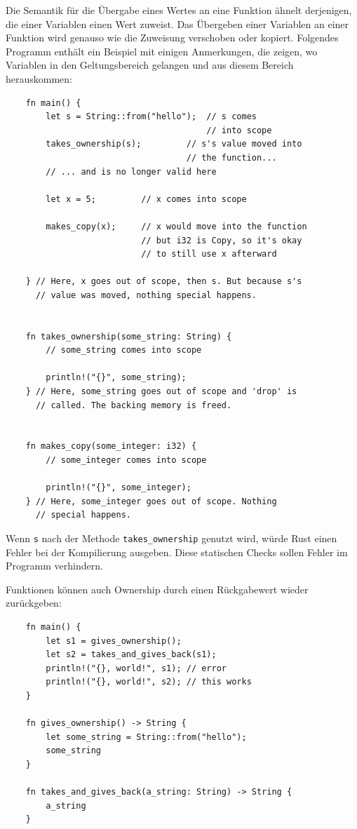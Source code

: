 Die Semantik für die Übergabe eines Wertes an eine Funktion ähnelt derjenigen, die einer Variablen einen Wert zuweist. Das Übergeben einer Variablen an einer Funktion wird genauso wie die Zuweisung verschoben oder kopiert. Folgendes Programm enthält ein Beispiel mit einigen Anmerkungen, die zeigen, wo Variablen in den Geltungsbereich gelangen und aus diesem Bereich herauskommen:

\begin{lstlisting}
    fn main() {
        let s = String::from("hello");  // s comes
                                        // into scope
        takes_ownership(s);         // s's value moved into
                                    // the function...
        // ... and is no longer valid here

        let x = 5;         // x comes into scope

        makes_copy(x);     // x would move into the function
                           // but i32 is Copy, so it's okay
                           // to still use x afterward

    } // Here, x goes out of scope, then s. But because s's
      // value was moved, nothing special happens.


    fn takes_ownership(some_string: String) {
        // some_string comes into scope

        println!("{}", some_string);
    } // Here, some_string goes out of scope and 'drop' is
      // called. The backing memory is freed.


    fn makes_copy(some_integer: i32) {
        // some_integer comes into scope

        println!("{}", some_integer);
    } // Here, some_integer goes out of scope. Nothing
      // special happens.
\end{lstlisting}

Wenn \verb"s" nach der Methode \verb"takes_ownership" genutzt wird, würde Rust einen Fehler bei der Kompilierung ausgeben. Diese statischen Checks sollen Fehler im Programm verhindern.

Funktionen können auch Ownership durch einen Rückgabewert wieder zu\-rück\-ge\-ben:

\begin{lstlisting}
    fn main() {
        let s1 = gives_ownership();
        let s2 = takes_and_gives_back(s1);
        println!("{}, world!", s1); // error
        println!("{}, world!", s2); // this works
    }

    fn gives_ownership() -> String {
        let some_string = String::from("hello");
        some_string
    }

    fn takes_and_gives_back(a_string: String) -> String {
        a_string
    }
\end{lstlisting}

